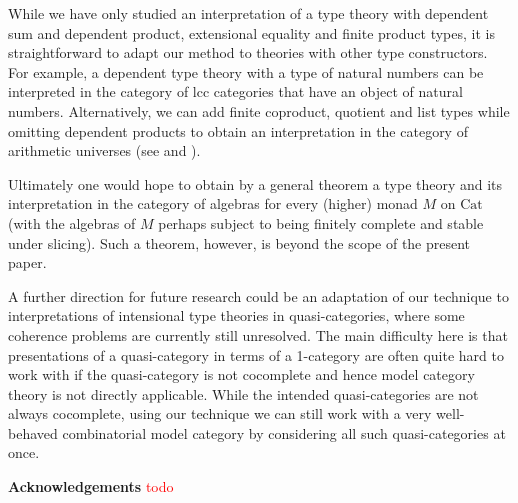 \documentclass[a4paper]{article}
\newcommand{\todo}[1]{\textcolor{red}{#1}}
\theoremstyle{remark}
\theoremstyle{definition}
\begin{document}
While we have only studied an interpretation of a type theory with dependent sum and dependent product, extensional equality and finite product types, it is straightforward to adapt our method to theories with other type constructors.
For example, a dependent type theory with a type of natural numbers can be interpreted in the category of lcc categories that have an object of natural numbers.
Alternatively, we can add finite coproduct, quotient and list types while omitting dependent products to obtain an interpretation in the category of arithmetic universes (see \cite{au-as-list-arithmetic-pretopos} and \cite{au-sketches}).

Ultimately one would hope to obtain by a general theorem a type theory and its interpretation in the category of algebras for every (higher) monad $M$ on $\mathrm{Cat}$ (with the algebras of $M$ perhaps subject to being finitely complete and stable under slicing).
Such a theorem, however, is beyond the scope of the present paper.

A further direction for future research could be an adaptation of our technique to interpretations of intensional type theories in quasi-categories, where some coherence problems are currently still unresolved.
The main difficulty here is that presentations of a quasi-category in terms of a 1-category are often quite hard to work with if the quasi-category is not cocomplete and hence model category theory is not directly applicable.
While the intended quasi-categories are not always cocomplete, using our technique we can still work with a very well-behaved combinatorial model category by considering all such quasi-categories at once.

\textbf{Acknowledgements} \todo{todo}





\end{document}
